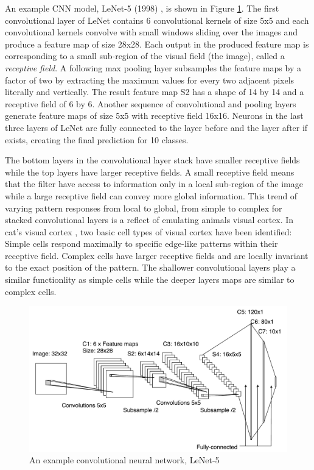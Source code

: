 
An example CNN model, LeNet-5 (1998) \cite{lecun1998gradient}, is shown in Figure \ref{fig:lenet}.
The first convolutional layer of LeNet contains 6 convolutional kernels of size 5x5 and each convolutional kernels convolve with small windows sliding over the images and produce a feature map of size 28x28.
Each output in the produced feature map is corresponding to a small sub-region of the visual field (the image), called a \textit{receptive field}.
A following max pooling layer subsamples the feature maps by a factor of two by extracting the maximum values for every two adjacent pixels literally and vertically.
The result feature map S2 has a shape of 14 by 14 and a receptive field of 6 by 6.
Another sequence of convolutional and pooling layers generate feature maps of size 5x5 with receptive field 16x16.
Neurons in the last three layers of LeNet are fully connected to the layer before and the layer after if exists, creating the final prediction for 10 classes.


The bottom layers in the convolutional layer stack have smaller receptive fields while the top layers have larger receptive fields.
A small receptive field means that the filter have access to information only in a local sub-region of the image while a large receptive field can convey more global information.
This trend of varying pattern responses from local to global, from simple to complex for stacked convolutional layers is a reflect of emulating animals visual cortex.
In cat's visual cortex \cite{hubel1962receptive}, two basic cell types of visual cortex have been identified:
Simple cells respond maximally to specific edge-like patterns within their receptive field.
Complex cells have larger receptive fields and are locally invariant to the exact position of the pattern.
The shallower convolutional layers play a similar functionlity as simple cells while the deeper layers maps are similar to complex cells.

\begin{figure}[t]
\centering
   \includegraphics[width=\linewidth]{img/lenet}
\caption{An example convolutional neural network, LeNet-5 \cite{lecun1998gradient}}
\label{fig:lenet}
\end{figure}

